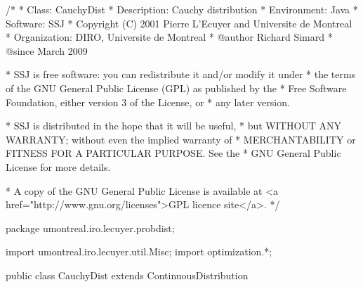 \begin{code}\begin{hide}
/*
 * Class:        CauchyDist
 * Description:  Cauchy distribution
 * Environment:  Java
 * Software:     SSJ
 * Copyright (C) 2001  Pierre L'Ecuyer and Universite de Montreal
 * Organization: DIRO, Universite de Montreal
 * @author       Richard Simard
 * @since        March 2009

 * SSJ is free software: you can redistribute it and/or modify it under
 * the terms of the GNU General Public License (GPL) as published by the
 * Free Software Foundation, either version 3 of the License, or
 * any later version.

 * SSJ is distributed in the hope that it will be useful,
 * but WITHOUT ANY WARRANTY; without even the implied warranty of
 * MERCHANTABILITY or FITNESS FOR A PARTICULAR PURPOSE.  See the
 * GNU General Public License for more details.

 * A copy of the GNU General Public License is available at
   <a href="http://www.gnu.org/licenses">GPL licence site</a>.
 */
\end{hide}
package umontreal.iro.lecuyer.probdist;
\begin{hide}
import umontreal.iro.lecuyer.util.Misc;
import optimization.*;
\end{hide}

public class CauchyDist extends ContinuousDistribution\begin{hide} {
   private double alpha;
   private double beta;

   private static class Optim implements Uncmin_methods
   {
      private int n;
      private double[] xi;

      public Optim (double[] x, int n)
      {
         this.n = n;
         this.xi = new double[n];
         System.arraycopy (x, 0, this.xi, 0, n);
      }

      public double f_to_minimize (double[] p)
      {
         double sum = 0.0;

         if (p[2] <= 0.0)               // barrier at 0
            return 1.0e200;

         for (int i = 0; i < n; i++)
            sum -= Math.log (density (p[1], p[2], xi[i]));

         return sum;
      }

      public void gradient (double[] x, double[] g)
      {
      }

      public void hessian (double[] x, double[][] h)
      {
      }
   }
\end{hide}
\end{code}
